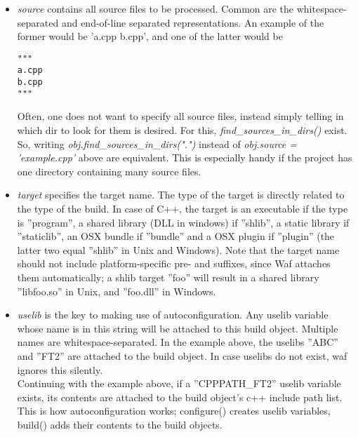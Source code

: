 \documentclass[a4,10pt]{article}
\begin{document}
\begin{itemize}

\item \emph{source} contains all source files to be processed. Common are the whitespace-separated and end-of-line separated representations. An example of the former would be 'a.cpp b.cpp', and one of the latter would be
\\
\begin{verbatim}
"""
a.cpp
b.cpp
"""
\end{verbatim}

Often, one does not want to specify all source files, instead simply telling in which dir to look for them is desired. For this, \emph{find\_sources\_in\_dirs()} exist. So, writing \emph{obj.find\_sources\_in\_dirs(".")} instead of \emph{obj.source = 'example.cpp'} above are equivalent. This is especially handy if the project has one directory containing many source files.

\item \emph{target} specifies the target name. The type of the target is directly related to the type of the build. In case of C++, the target is an executable if the type is ''program'', a shared library (DLL in windows) if ''shlib'', a static library if ''staticlib'', an OSX bundle if ''bundle'' and a OSX plugin if ''plugin'' (the latter two equal ''shlib'' in Unix and Windows). Note that the target name should not include platform-specific pre- and suffixes, since Waf attaches them automatically; a shlib target ''foo'' will result in a shared library ''libfoo.so'' in Unix, and ''foo.dll'' in Windows.

\item \emph{uselib} is the key to making use of autoconfiguration. Any uselib variable whose name is in this string will be attached to this build object. Multiple names are whitespace-separated. In the example above, the uselibs ''ABC'' and ''FT2'' are attached to the build object. In case uselibs do not exist, waf ignores this silently.\\
Continuing with the example above, if a ''CPPPATH\_FT2'' uselib variable exists, its contents are attached to the build object's c++ include path list. This is how autoconfiguration works; configure() creates uselib variables, build() adds their contents to the build objects.

\end{itemize}
\end{document}
